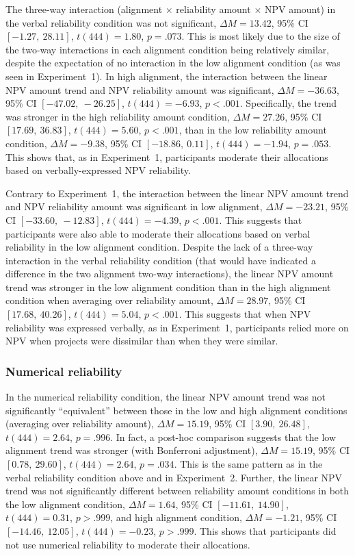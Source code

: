 \documentclass[a4paper, nobind, dvipsnames]{templates/ociamthesis}
\theoremstyle{definition}
\theoremstyle{definition}
\theoremstyle{definition}
\theoremstyle{definition}
\theoremstyle{remark}
\begin{document}
The three-way interaction (alignment \(\times\) reliability amount \(\times\) NPV
amount) in the verbal reliability condition was not significant,
\(\Delta M = 13.42\), 95\% CI \([-1.27,~28.11]\), \(t(444) = 1.80\), \(p = .073\). This is
most likely due to the size of the two-way interactions in each alignment
condition being relatively similar, despite the expectation of no interaction in
the low alignment condition (as was seen in Experiment~1). In high alignment,
the interaction between the linear NPV amount trend and NPV reliability amount
was significant,
\(\Delta M = -36.63\), 95\% CI \([-47.02,~-26.25]\), \(t(444) = -6.93\), \(p < .001\).
Specifically, the trend was stronger in the high reliability amount condition,
\(\Delta M = 27.26\), 95\% CI \([17.69,~36.83]\), \(t(444) = 5.60\), \(p < .001\),
than in the low reliability amount condition,
\(\Delta M = -9.38\), 95\% CI \([-18.86,~0.11]\), \(t(444) = -1.94\), \(p = .053\).
This shows that, as in Experiment~1, participants moderate their allocations
based on verbally-expressed NPV reliability.

Contrary to Experiment~1, the interaction between the linear NPV amount trend
and NPV reliability amount was significant in low alignment,
\(\Delta M = -23.21\), 95\% CI \([-33.60,~-12.83]\), \(t(444) = -4.39\), \(p < .001\).
This suggests that participants were also able to moderate their allocations
based on verbal reliability in the low alignment condition. Despite the lack of
a three-way interaction in the verbal reliability condition (that would have
indicated a difference in the two alignment two-way interactions), the linear
NPV amount trend was stronger in the low alignment condition than in the high
alignment condition when averaging over reliability amount,
\(\Delta M = 28.97\), 95\% CI \([17.68,~40.26]\), \(t(444) = 5.04\), \(p < .001\). This
suggests that when NPV reliability was expressed verbally, as in Experiment~1,
participants relied more on NPV when projects were dissimilar than when they
were similar.

\subsubsection{Numerical reliability}

In the numerical reliability condition, the linear NPV amount trend was not
significantly ``equivalent'' between those in the low and high alignment
conditions (averaging over reliability amount),
\(\Delta M = 15.19\), 95\% CI \([3.90,~26.48]\), \(t(444) = 2.64\), \(p = .996\). In
fact, a post-hoc comparison suggests that the low alignment trend was stronger
(with Bonferroni adjustment),
\(\Delta M = 15.19\), 95\% CI \([0.78,~29.60]\), \(t(444) = 2.64\), \(p = .034\). This is
the same pattern as in the verbal reliability condition above and in
Experiment~2. Further, the linear NPV trend was not significantly different
between reliability amount conditions in both the low alignment condition,
\(\Delta M = 1.64\), 95\% CI \([-11.61,~14.90]\), \(t(444) = 0.31\), \(p > .999\),
and high alignment condition,
\(\Delta M = -1.21\), 95\% CI \([-14.46,~12.05]\), \(t(444) = -0.23\), \(p > .999\).
This shows that participants did not use numerical reliability to moderate their
allocations.
\end{document}
